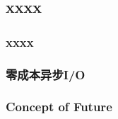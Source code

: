 \subsection{xxxx} %
\begin{frame}[fragile]
    \frametitle{xxxx}
\end{frame}
% 
% 
\begin{frame}[fragile]
    \frametitle{零成本异步I/O}
\end{frame}
% 
% 
% 
% 
% 
% 
% 
\begin{frame}[fragile]
    \frametitle{Concept of Future}
\end{frame}
